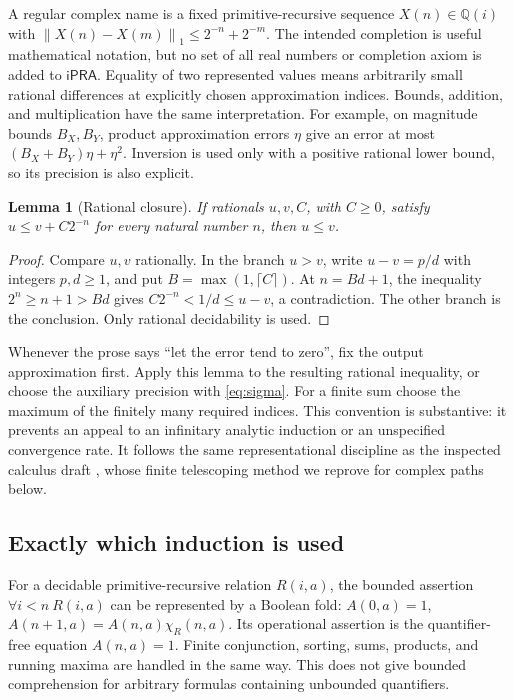 \documentclass[11pt]{article}
\newtheorem{lemma}[theorem]{Lemma}
\theoremstyle{definition}
\newcommand{\Q}{\mathbb Q}
\newcommand{\ipra}{\mathsf{iPRA}}
\newcommand{\norm}[1]{\left\lVert#1\right\rVert_1}
\begin{document}
A regular complex name is a fixed primitive-recursive sequence
\(X(n)\in\Q(i)\) with
\(\norm{X(n)-X(m)}\le2^{-n}+2^{-m}\).
The intended completion is useful mathematical notation, but no set of
all real numbers or completion axiom is added to \(\ipra\).
Equality of two represented values means arbitrarily small rational
differences at explicitly chosen approximation indices. Bounds,
addition, and multiplication have the same interpretation. For example,
on magnitude bounds \(B_X,B_Y\), product approximation errors \(\eta\)
give an error at most \((B_X+B_Y)\eta+\eta^2\). Inversion is used only
with a positive rational lower bound, so its precision is also explicit.

\begin{lemma}[Rational closure]\label{lem:closure}
If rationals \(u,v,C\), with \(C\ge0\), satisfy
\(u\le v+C2^{-n}\) for every natural number \(n\), then \(u\le v\).
\end{lemma}
\begin{proof}
Compare \(u,v\) rationally. In the branch \(u>v\), write
\(u-v=p/d\) with integers \(p,d\ge1\), and put
\(B=\max(1,\lceil C\rceil)\). At \(n=Bd+1\), the inequality
\(2^n\ge n+1>Bd\) gives \(C2^{-n}<1/d\le u-v\), a contradiction.
The other branch is the conclusion. Only rational decidability is used.
\end{proof}

Whenever the prose says ``let the error tend to zero'', fix the output
approximation first. Apply this lemma to the resulting rational
inequality, or choose the auxiliary precision with
\eqref{eq:sigma}. For a finite sum choose the maximum of the finitely
many required indices. This convention is substantive: it prevents an
appeal to an infinitary analytic induction or an unspecified convergence
rate. It follows the same representational discipline as the inspected
calculus draft \cite{calculusdraft}, whose finite telescoping method we
reprove for complex paths below.

\subsection{Exactly which induction is used}

For a decidable primitive-recursive relation \(R(i,a)\), the bounded
assertion \(\forall i<n\ R(i,a)\) can be represented by a Boolean fold:
\(A(0,a)=1\), \(A(n+1,a)=A(n,a)\chi_R(n,a)\).
Its operational assertion is the quantifier-free equation \(A(n,a)=1\).
Finite conjunction, sorting, sums, products, and running maxima are
handled in the same way. This does not give bounded comprehension for
arbitrary formulas containing unbounded quantifiers.
\end{document}
